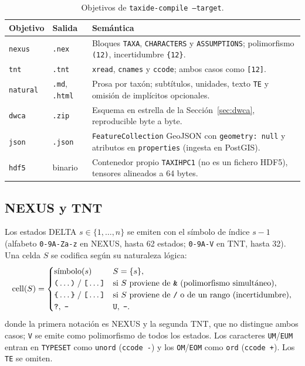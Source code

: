 \documentclass[11pt,a4paper]{article}
\theoremstyle{definition}
\theoremstyle{remark}
\begin{document}
\begin{table}[ht]
\centering
\small
\caption{Objetivos de \texttt{taxide-compile --target}.}
\label{tab:targets}
\begin{tabularx}{\textwidth}{@{}l l X@{}}
\toprule
\textbf{Objetivo} & \textbf{Salida} & \textbf{Semántica} \\
\midrule
\texttt{nexus} & \texttt{.nex} & Bloques \texttt{TAXA}, \texttt{CHARACTERS} y \texttt{ASSUMPTIONS}; polimorfismo \texttt{(12)}, incertidumbre \texttt{\{12\}}. \\
\texttt{tnt} & \texttt{.tnt} & \texttt{xread}, \texttt{cnames} y \texttt{ccode}; ambos casos como \texttt{[12]}. \\
\texttt{natural} & \texttt{.md}, \texttt{.html} & Prosa por taxón; subtítulos, unidades, texto \texttt{TE} y omisión de implícitos opcionales. \\
\texttt{dwca} & \texttt{.zip} & Esquema en estrella de la Sección~\ref{sec:dwca}, reproducible byte a byte. \\
\texttt{json} & \texttt{.json} & \texttt{FeatureCollection} GeoJSON con \texttt{geometry: null} y atributos en \texttt{properties} (ingesta en PostGIS). \\
\texttt{hdf5} & binario & Contenedor propio \texttt{TAXIHPC1} (no es un fichero HDF5), tensores alineados a 64 bytes. \\
\bottomrule
\end{tabularx}
\end{table}

\subsection{NEXUS y TNT}
Los estados DELTA $s \in \{1,\dots,n\}$ se emiten con el símbolo de índice $s-1$ (alfabeto \texttt{0-9A-Za-z} en NEXUS, hasta 62 estados; \texttt{0-9A-V} en TNT, hasta 32). Una celda $S$ se codifica según su naturaleza lógica:
\begin{equation}
\mathrm{cell}(S) =
\begin{cases}
\text{símbolo}(s) & S = \{s\},\\
\texttt{(}\dots\texttt{)} \;/\; \texttt{[}\dots\texttt{]} & \text{si $S$ proviene de \texttt{\&} (polimorfismo simultáneo)},\\
\texttt{\{}\dots\texttt{\}} \;/\; \texttt{[}\dots\texttt{]} & \text{si $S$ proviene de \texttt{/} o de un rango (incertidumbre)},\\
\texttt{?},\; \texttt{-} & \texttt{U},\; \texttt{-}.
\end{cases}
\end{equation}
donde la primera notación es NEXUS y la segunda TNT, que no distingue ambos casos; \texttt{V} se emite como polimorfismo de todos los estados. Los caracteres \texttt{UM}/\texttt{EUM} entran en \texttt{TYPESET} como \texttt{unord} (\texttt{ccode -}) y los \texttt{OM}/\texttt{EOM} como \texttt{ord} (\texttt{ccode +}). Los \texttt{TE} se omiten.
\end{document}
